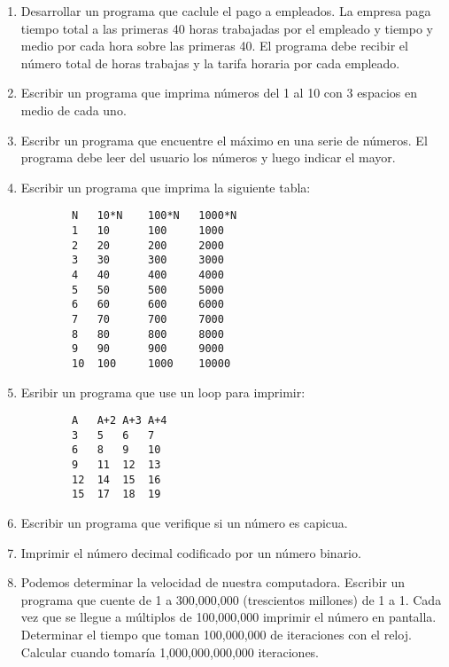\documentclass[12pt]{article}
\begin{document}
\begin{enumerate}
    \item Desarrollar un programa que caclule el pago a empleados. La empresa paga tiempo total a las primeras 40 horas trabajadas
        por el empleado y tiempo y medio por cada hora sobre las primeras 40. El programa debe recibir el n\'umero total de horas 
        trabajas y la tarifa horaria por cada empleado.

    \item Escribir un programa que imprima n\'umeros del 1 al 10 con 3 espacios en medio de cada uno.

    \item Escribr un programa que encuentre el m\'aximo en una serie de n\'umeros. El programa debe leer
        del usuario los n\'umeros y luego indicar el mayor. 

    \item Escribir un programa que imprima la siguiente tabla:
        \begin{verbatim}
        N   10*N    100*N   1000*N
        1   10      100     1000
        2   20      200     2000
        3   30      300     3000
        4   40      400     4000
        5   50      500     5000
        6   60      600     6000
        7   70      700     7000
        8   80      800     8000
        9   90      900     9000
        10  100     1000    10000
        \end{verbatim}

    \item Esribir un programa que use un loop para imprimir:
        \begin{verbatim}
        A   A+2 A+3 A+4
        3   5   6   7
        6   8   9   10
        9   11  12  13
        12  14  15  16
        15  17  18  19
        \end{verbatim}

    \item Escribir un programa que verifique si un n\'umero es capicua.
    \item Imprimir el n\'umero decimal codificado por un n\'umero binario.
    \item Podemos determinar la velocidad de nuestra computadora. Escribir un programa
        que cuente de 1 a 300,000,000 (trescientos millones) de 1 a 1. Cada vez que se llegue a m\'ultiplos de 100,000,000
        imprimir el n\'umero en pantalla. Determinar el tiempo que toman 100,000,000 de iteraciones con el reloj. Calcular
        cuando tomar\'ia 1,000,000,000,000 iteraciones.


\end{enumerate}
\end{document}
